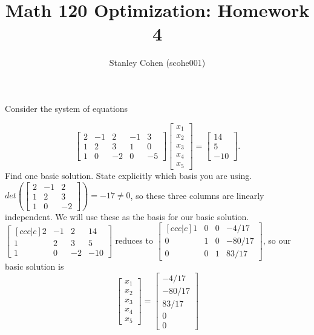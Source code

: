 \documentclass[12pt]{extarticle}
\title{Math 120 Optimization: Homework 4}
\author{Stanley Cohen (scohe001)}
\date{}
\theoremstyle{definition}
\begin{document}
\maketitle

\begin{problem} Consider the system of equations 

	\[\begin{bmatrix}
	2&-1&2&-1&3\\1&2&3&1&0\\1&0&-2&0&-5
	\end{bmatrix}\begin{bmatrix}
	x_1\\x_2\\x_3\\x_4\\x_5
	\end{bmatrix}=\begin{bmatrix}
	14\\5\\-10
	\end{bmatrix}.\]
	Find one basic solution. State explicitly which basis you are using.\\

	$det(\begin{bmatrix}2&-1&2\\1&2&3\\1&0&-2\end{bmatrix}) = -17 \neq 0$, 
		so these three columns are linearly independent. We will use these as the basis for our basic solution.\\

	$\begin{bmatrix}[ccc|c]2&-1&2&14\\1&2&3&5\\1&0&-2&-10\end{bmatrix}$ reduces to $\begin{bmatrix}[ccc|c]1&0&0&-4/17\\0&1&0&-80/17\\0&0&1&83/17\end{bmatrix}$, so our basic solution is
	$$\begin{bmatrix}
	x_1\\x_2\\x_3\\x_4\\x_5
	\end{bmatrix} = \begin{bmatrix}
	-4/17\\-80/17\\83/17\\0\\0
	\end{bmatrix}$$

\end{problem}
\end{document}
